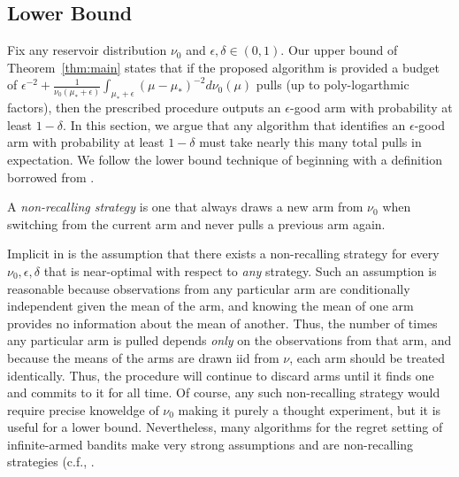 \subsection{Lower Bound}

Fix any reservoir distribution $\nu_0$ and $\epsilon,\delta \in (0,1)$. 
Our upper bound of Theorem~\ref{thm:main} states that if the proposed algorithm is provided a budget of $\epsilon^{-2}+\frac{1}{\nu_0(\mu_* + \epsilon)}\int_{\mu_*+\epsilon} (\mu-\mu_*)^{-2} d\nu_0(\mu)$ pulls (up to poly-logarthmic factors), then the prescribed procedure outputs an $\epsilon$-good arm with probability at least $1-\delta$.
In this section, we argue that any algorithm that identifies an $\epsilon$-good arm with probability at least $1-\delta$ must take nearly this many total pulls in expectation.
We follow the lower bound technique of \cite{malloy2012quickest} beginning with a definition borrowed from \cite{berry1997}.
\begin{definition}
A \emph{non-recalling strategy} is one that always draws a new arm from $\nu_0$ when switching from the current arm and never pulls a previous arm again.
\end{definition}

Implicit in \cite{malloy2012quickest} is the assumption that there exists a non-recalling strategy for every $\nu_0, \epsilon, \delta$ that is near-optimal with respect to \emph{any} strategy.
Such an assumption is reasonable because observations from any particular arm are conditionally independent given the mean of the arm, and knowing the mean of one arm provides no information about the mean of another. 
Thus, the number of times any particular arm is pulled depends \emph{only} on the observations from that arm, and because the means of the arms are drawn iid from $\nu$, each arm should be treated identically.
Thus, the procedure will continue to discard arms until it finds one and commits to it for all time. 
Of course, any such non-recalling strategy would require precise knoweldge of $\nu_0$ making it purely a thought experiment, but it is useful for a lower bound.
Nevertheless, many algorithms for the regret setting of infinite-armed bandits make very strong assumptions and are non-recalling strategies (c.f., \cite{berry1997,bonald2013two,Chan2018Infinite}.

